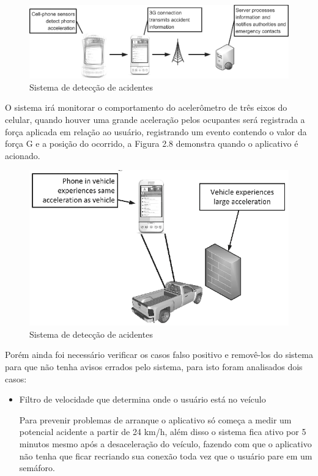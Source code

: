 \begin{figure}[H]

 \caption{Sistema de detecção de acidentes}
  \includegraphics[width=150mm]{images/Cap2/esquema.png}
  
    
\end{figure}


O sistema irá monitorar o comportamento do acelerômetro de três eixos do celular, quando houver uma grande aceleração pelos ocupantes será registrada a força aplicada em relação ao usuário, registrando um evento contendo o valor da força G e a posição do ocorrido, a Figura 2.8 demonstra quando o aplicativo é acionado.


\begin{figure}[H]

 \caption{Sistema de detecção de acidentes}
  \includegraphics[width=150mm]{images/Cap2/acionamento.png}
  
    
\end{figure}


Porém ainda foi necessário verificar os casos falso positivo e removê-los do sistema para que não tenha avisos errados pelo sistema, para isto foram analisados dois casos:

\begin{itemize}
    \item  Filtro de velocidade que determina onde o usuário está no veículo
    
    Para prevenir problemas de arranque o aplicativo só começa a medir um potencial acidente a partir de 24 km/h, além disso o sistema fica ativo por 5 minutos mesmo após a desaceleração do veículo, fazendo com que o aplicativo não tenha que ficar recriando sua conexão toda vez que o usuário pare em um semáforo.
\end{itemize}


